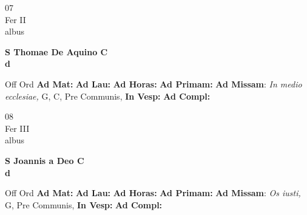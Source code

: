 \documentclass[10pt, openany]{book}
\begin{document}
    \begin{center}
        \begin{minipage}{3.5in}
            \vspace{2em}
            \begin{minipage}{0.5in}
                {\Huge 07} \\
                {\normalsize Fer II} \\
                {\normalsize albus}
            \end{minipage}
            \begin{minipage}{3.0in}
                \textbf{ \large S Thomae De Aquino C \\
                \textnormal{\normalsize d}} \\ 
            \end{minipage}
            \begin{justify}Off Ord
                \textbf{Ad Mat: }
                \textbf{Ad Lau: }
                \textbf{Ad Horas: }
                \textbf{Ad Primam: }\textbf{Ad Missam}: \textit{In medio ecclesiae,} G, C, Pre Communis,  
                \textbf{In Vesp: }
                \textbf{Ad Compl: }
            \end{justify}
        \end{minipage}
    \end{center}

    \begin{center}
        \begin{minipage}{3.5in}
            \vspace{2em}
            \begin{minipage}{0.5in}
                {\Huge 08} \\
                {\normalsize Fer III} \\
                {\normalsize albus}
            \end{minipage}
            \begin{minipage}{3.0in}
                \textbf{ \large S Joannis a Deo C \\
                \textnormal{\normalsize d}} \\ 
            \end{minipage}
            \begin{justify}Off Ord
                \textbf{Ad Mat: }
                \textbf{Ad Lau: }
                \textbf{Ad Horas: }
                \textbf{Ad Primam: }\textbf{Ad Missam}: \textit{Os iusti,} G, Pre Communis,  
                \textbf{In Vesp: }
                \textbf{Ad Compl: }
            \end{justify}
        \end{minipage}
    \end{center}
\end{document}
